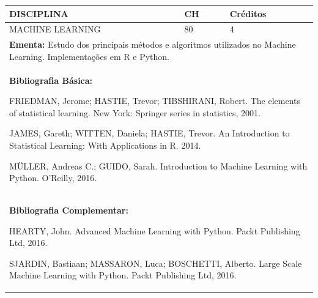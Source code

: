 \documentclass[a4paper, 12pt, openright, oneside, german, french, english, brazil]{abntex2}
\begin{document}
\begin{table}[!h]
  \footnotesize
  \centering
  \begin{tabular}{|p{100mm}|p{10mm}|p{20mm}|}
    \hline
    \textbf{DISCIPLINA} & \textbf{CH} & \textbf{Créditos} \\
    \hline
    MACHINE LEARNING & 80 & 4 \\
    \hline
    \multicolumn{3}{|p{130mm}|}{\textbf{Ementa:}  Estudo dos principais métodos e algoritmos utilizados no Machine Learning. Implementações em R e Python. } \\
    \hline
    \multicolumn{3}{|p{130mm}|}{\textbf{Bibliografia Básica:}

    FRIEDMAN, Jerome; HASTIE, Trevor; TIBSHIRANI, Robert. The elements of statistical learning. New York: Springer series in statistics, 2001.

JAMES, Gareth; WITTEN, Daniela; HASTIE, Trevor. An Introduction to Statistical Learning: With Applications in R. 2014.

MÜLLER, Andreas C.; GUIDO, Sarah. Introduction to Machine Learning with Python. O’Reilly, 2016.
} \\
    \hline
    \multicolumn{3}{|p{130mm}|}{\textbf{Bibliografia Complementar:}

    HEARTY, John. Advanced Machine Learning with Python. Packt Publishing Ltd, 2016.

SJARDIN, Bastiaan; MASSARON, Luca; BOSCHETTI, Alberto. Large Scale Machine Learning with Python. Packt Publishing Ltd, 2016.
} \\
    \hline
  \end{tabular}
\end{table}
\end{document}
